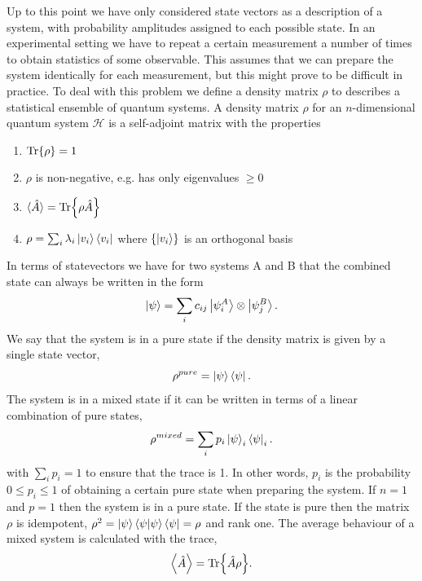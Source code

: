 Up to this point we have only considered state vectors as a description of a system, with probability amplitudes assigned to each possible state. In an experimental setting we have to repeat a certain measurement a number of times to obtain statistics of some observable. This assumes that we can prepare the system identically for each measurement, but this might prove to be difficult in practice. To deal with this problem we define a density matrix $\rho$ to describes a statistical ensemble of quantum systems.
A density matrix $\rho$ for an $n$-dimensional quantum system $\mathcal{H}$ is a self-adjoint matrix with the properties
\begin{enumerate}
    \item $\Tr{\rho}=1$
    \item $\rho$ is non-negative, e.g. has only eigenvalues $\geq 0$
    \item $\langle \hat{A} \rangle = \Tr{\rho \hat{A}}$
    \item $\rho = \sum_i \lambda_i \ket{v_i}\bra{v_i}$ where $\{\ket{v_i}\}$ is an orthogonal basis
\end{enumerate}
In terms of statevectors we have for two systems A and B that the combined state can always be written in the form
\begin{equation}
    \ket{\psi} = \sum_i c_{ij} \ket{\psi^A_i} \otimes \ket{\psi^B_j}
    \label{eq:pure_state}.
\end{equation}
We say that the system is in a pure state if the density matrix is given by a single state vector,
\begin{equation}
    \rho^{pure} = \ket{\psi} \bra{\psi} \label{eq:rho_pure}.
\end{equation}
The system is in a mixed state if it can be written in terms of a linear combination of pure states,
\begin{equation}
    \rho^{mixed} = \sum_i p_i \ket{\psi}_i \bra{\psi}_i \label{eq:rho_mixed}.
\end{equation}
with $\sum_i p_i =1$ to ensure that the trace is 1. In other words, $p_i$ is the probability $0\leq p_i \leq 1$ of obtaining a certain pure state when preparing the system. If $n=1$ and $p = 1$ then the system is in a pure state. If the state is pure then the matrix $\rho$ is idempotent, $\rho^2=\ket{\psi}\bra{\psi}\ket{\psi}\bra{\psi}=\rho$ and rank one. The average behaviour of a mixed system is calculated with the trace,
\begin{equation}
    \expval{\hat{A}} = \Tr{\hat{A}\rho} \label{def:density_mat}.
\end{equation}

